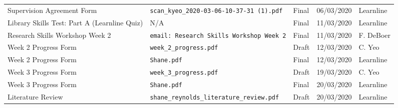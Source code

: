 \documentclass[10pt, landscape]{article}
\begin{document}
\begin{longtable}{p{7cm}p{10cm}p{1.5cm}p{2cm}p{2cm}}
	Supervision Agreement Form						& \verb|scan_kyeo_2020-03-06-10-37-31 (1).pdf|								& Final				& 06/03/2020			& Learnline\\
	
	Library Skills Test: Part A (Learnline Quiz)	& N/A																		& Final 			& 11/03/2020		 	& Learnline\\
	
	Research Skills Workshop Week 2					& \verb|email: Research Skills Workshop Week 2|								& Final				& 11/03/2020		 	& F. DeBoer\\
	
	Week 2 Progress Form							& \verb|week_2_progress.pdf|												& Draft				& 12/03/2020			& C. Yeo\\
	
	Week 2 Progress Form							& \verb|Shane.pdf|															& Final				& 12/03/2020			& Learnline\\
	
	Week 3 Progress Form							& \verb|week_3_progress.pdf|												& Draft				& 19/03/2020			& C. Yeo\\
		
	Week 3 Progress Form							& \verb|Shane.pdf|															& Final				& 20/03/2020			& Learnline\\
	
	Literature Review 								& \verb|shane_reynolds_literature_review.pdf|								& Draft 			& 20/03/2020		 	& Learnline\\
	\bottomrule
	\end{longtable}
\end{document}
